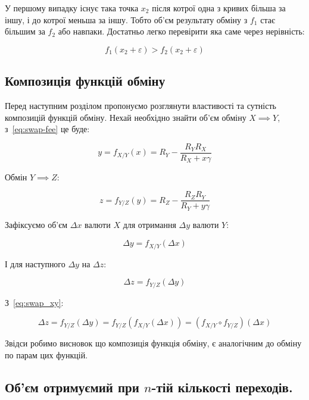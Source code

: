 \documentclass[../index.tex]{subfiles}
\begin{document}
У першому випадку існує така точка $x_{2}$ після котрої одна з кривих більша за
іншу, і до котрої меньша за іншу. Тобто об'єм результату обміну з $f_{1}$ стає
більшим за $f_{2}$ або навпаки. Достатньо легко перевірити яка саме через
нерівність:

\begin{equation*}
  f_{1}(x_{2} + \varepsilon) > f_{2}(x_{2} + \varepsilon)
\end{equation*}

\subsection{Композиція функцій обміну}\label{sec:func-composition}

Перед наступним розділом пропонуємо розглянути властивості та сутність
композицій функцій обміну. Нехай необхідно знайти об'єм обміну \(X \implies Y\),
з~\eqref{eq:swap-fee} це буде:

\begin{equation*}
	y = f_{X/Y}(x) = R_{Y} - \frac{R_{Y} R_{X}}{R_{X} + x \gamma}
\end{equation*}

Обмін \(Y \implies Z\):

\begin{equation*}
	z = f_{Y/Z}(y) = R_{Z} - \frac{R_{Z} R_{Y}}{R_{Y} + y \gamma}
\end{equation*}

Зафіксуємо об'єм $\Delta x$ валюти $X$ для отримання $\Delta y$ валюти $Y$:

\begin{equation}\label{eq:swap_xy}
	\Delta y = f_{X/Y}(\Delta x)
\end{equation}

І для наступного $\Delta y$ на $\Delta z$:

\begin{equation*}
	\Delta z = f_{Y/Z}(\Delta y)
\end{equation*}

З~\eqref{eq:swap_xy}:

\begin{equation*}
	\Delta z = f_{Y/Z}(\Delta y) = f_{Y/Z}(f_{X/Y}(\Delta x)) = (f_{X/Y} \circ f_{Y/Z})(\Delta x)
\end{equation*}

Звідси робимо висновок що композиція функція обміну, є аналогічним до обміну по
парам цих функцій.

\subsection{Об'єм отримуємий при \(n\)-тій кількості переходів.}\label{sec:nth-swap}
\end{document}
